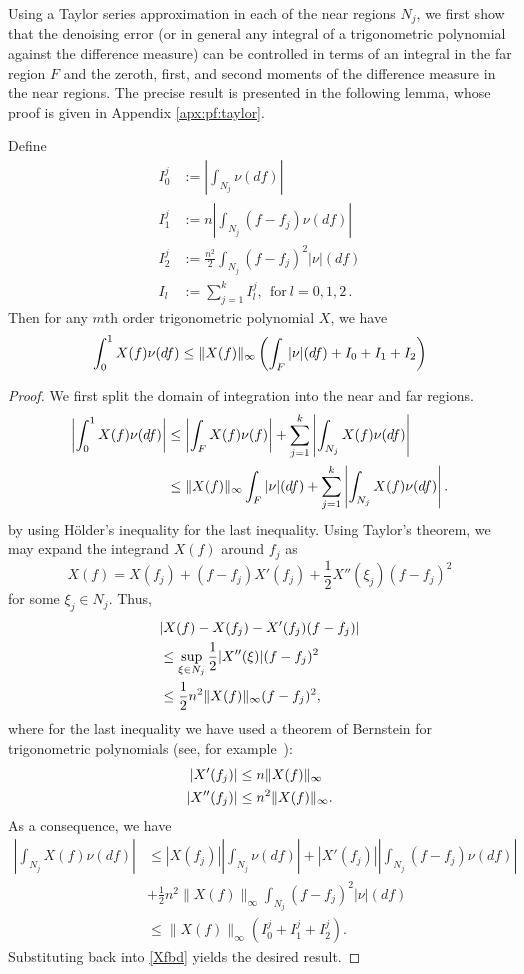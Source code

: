 Using a Taylor series approximation in each of 
the near regions $N_j$, we first show that the denoising error (or in general any 
integral of a trigonometric polynomial against the difference measure) can be controlled in terms 
of an integral in the far region $F$ and the zeroth, first, and second 
moments of the difference measure in the near regions.  The precise result is presented in the following lemma, whose proof is given in Appendix \ref{apx:pf:taylor}.
\begin{lemma}
\label{part1}
Define
\begin{align*} 
I_0^j &:= \left| \int_{N_j} \nu(df) \right|\\
I_1^j &:= n \left| \int_{N_j} (f-f_j) \nu(df) \right|\\
I_2^j &:= \frac{n^2}{2} \int_{N_j} (f-f_j)^2 |\nu|(df)\\
I_l &:= \sum_{j=1}^k I_l^j,~~\mbox{for}~l = 0, 1, 2\,.
\end{align*}
Then for any $m$th order trigonometric polynomial $X$, we have
\[
\int_0^1{ X(f) \nu(df)}
\leq \lVert X(f)\rVert_\infty \left(\int_F{|\nu|(df)} + I_0 + I_1 + I_2\right)
\]
\end{lemma}
\begin{proof}\label{apx:pf:taylor}
We first split the domain of integration into the near and far regions.
\begin{align}
\left |\int_0^1 X(f) \nu(df)\right | 
&\leq \left |\int_F X(f) \nu (f)\right | + \sum_{j=1}^k \left | \int_{N_j}X(f) \nu(df)\right |\nonumber \\
&\leq \lVert X(f)\rVert_\infty \int_F |\nu| (df) + \sum_{j=1}^k \left | \int_{N_j}X(f) \nu(df) \right |.\label{Xfbd}
\end{align}
by using H\"{o}lder's inequality for the last inequality. Using Taylor's theorem, we may expand the integrand $X(f)$ around $f_j$ as
\[
X(f) = X(f_j) + (f-f_j) X'(f_j) + \frac{1}{2} X''(\xi_j) (f-f_j)^2 
\]
for some $\xi_j \in N_j$. 
Thus,
{\small
\begin{align*}
&|X(f)-X(f_j)-X'(f_j)(f-f_j)|\\
&\leq \sup_{\xi \in N_j} \frac{1}{2}|X''(\xi)|(f -f_j)^2\\ &\leq \frac{1}{2} n^2 \lVert X(f)\rVert_\infty(f - f_j)^2, 
\end{align*}
}
where for the last inequality we have used a theorem of Bernstein for trigonometric polynomials (see, for example~\cite{bernstein}):  
\begin{align*}
|X'(f_j)|  & \leq n \lVert X(f)\rVert_\infty\\
|X''(f_j)| & \leq n^2 \lVert X(f)\rVert_\infty.
\end{align*}
As a consequence, we have
\begin{align*}
\left | \int_{N_j} X(f) \nu(df)\right| &\leq \left| X(f_j)\right| \left| \int_{N_j} \nu (df)\right| + \left|X'(f_j)\right| \left|\int_{N_j} (f-f_j) \nu (df)  \right|\\
& + \frac{1}{2} n^2 \|X(f)\|_\infty \int_{N_j} (f-f_j)^2 |\nu| (df) \\
& \leq \|X(f)\|_\infty \left(I_0^j + I_1^j + I_2^j\right).
\end{align*}
Substituting back into \eqref{Xfbd} yields the desired result.
\end{proof}


